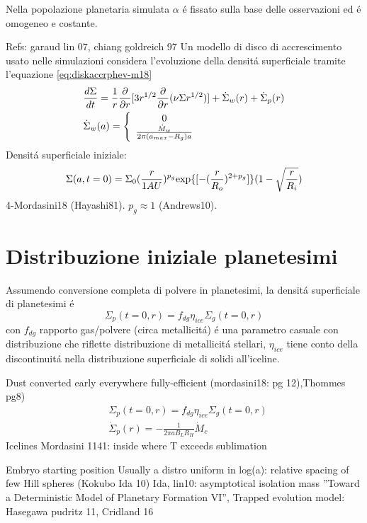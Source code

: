 \begin{workout}
Nella popolazione planetaria simulata $\alpha$ \'e fissato sulla base delle osservazioni  ed \'e omogeneo e costante.
\end{workout}

\begin{workout}
Refs: garaud lin 07, chiang goldreich 97
Un modello di disco  di accrescimento usato nelle simulazioni considera l'evoluzione della densit\'a superficiale tramite l'equazione \eqref{eq:diskaccrphev-m18}
\begin{align}
&\frac{d \Sigma}{d t}=\frac{1}{r}\frac{\partial}{\partial r}[3r^{1/2}\frac{\partial}{\partial r}(\nu\Sigma r^{1/2})]+\dot{\Sigma}_w(r)+\dot{\Sigma}_p(r)\label{eq:diskaccrphev-m18}\\
&\dot{\Sigma}_w(a)=\left\{\begin{array}{c}0\\\frac{\dot{M}_w}{2\pi(a_{max}-R_g)a}\\\end{array}\right.
\end{align}
Densit\'a superficiale iniziale:
\begin{equation}
\Sigma(a,t=0)=\Sigma_0(\frac{r}{1AU})^{p_g}\text{exp}\{[-(\frac{r}{R_o})^{2+p_g}]\}(1-\sqrt{\frac{r}{R_i}})
\end{equation}
4-Mordasini18 (Hayashi81). $p_g\approx1$ (Andrews10).
\end{workout}


\section{Distribuzione iniziale planetesimi}

Assumendo conversione completa di polvere in planetesimi, la densit\'a superficiale di planetesimi \'e
\begin{equation}
\Sigma_p(t=0,r)=f_{dg}\eta_{ice}\Sigma_g(t=0,r)
\end{equation}
con $f_{dg}$ rapporto gas/polvere (circa metallicit\'a) \'e una parametro casuale con distribuzione che riflette distribuzione di metallicit\'a stellari, $\eta_{ice}$ tiene conto della discontinuit\'a nella distribuzione superficiale di solidi all'iceline.

\begin{workout}
Dust converted early everywhere fully-efficient (mordasini18: pg 12),Thommes pg8)
\begin{align*}
&\Sigma_p(t=0,r)=f_{dg}\eta_{ice}\Sigma_g(t=0,r)\\
&\dot{\Sigma}_p(r)=-\frac{1}{2\pi aB_LR_H}\dot{M}_c
\end{align*}
Icelines Mordasini 1141: inside where T exceeds sublimation

{Embryo starting position}
Usually a distro uniform in log(a): relative spacing of few Hill spheres (Kokubo Ida 10)
Ida, lin10: asymptotical isolation mass ''Toward a Deterministic Model of Planetary Formation VI'',
Trapped evolution model: Hasegawa pudritz 11, Cridland 16

\end{workout}

